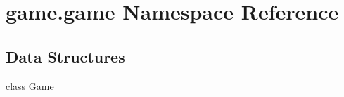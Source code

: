 \hypertarget{namespacegame_1_1game}{}\section{game.\+game Namespace Reference}
\label{namespacegame_1_1game}
\subsection*{Data Structures}
\begin{DoxyCompactItemize}
\item 
class \hyperlink{classgame_1_1game_1_1_game}{Game}
\end{DoxyCompactItemize}
